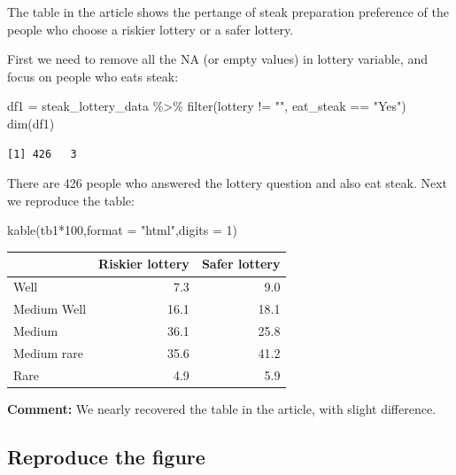 \documentclass[
  letterpaper,
  DIV=11,
  numbers=noendperiod]{scrartcl}
\newenvironment{Shaded}{\begin{snugshade}}{\end{snugshade}}
\newcommand{\AttributeTok}[1]{\textcolor[rgb]{0.40,0.45,0.13}{#1}}
\newcommand{\DecValTok}[1]{\textcolor[rgb]{0.68,0.00,0.00}{#1}}
\newcommand{\FunctionTok}[1]{\textcolor[rgb]{0.28,0.35,0.67}{#1}}
\newcommand{\NormalTok}[1]{\textcolor[rgb]{0.00,0.23,0.31}{#1}}
\newcommand{\OtherTok}[1]{\textcolor[rgb]{0.00,0.23,0.31}{#1}}
\newcommand{\SpecialCharTok}[1]{\textcolor[rgb]{0.37,0.37,0.37}{#1}}
\newcommand{\StringTok}[1]{\textcolor[rgb]{0.13,0.47,0.30}{#1}}
\begin{document}
The table in the article shows the pertange of steak preparation
preference of the people who choose a riskier lottery or a safer
lottery.

First we need to remove all the NA (or empty values) in lottery
variable, and focus on people who eats steak:

\begin{Shaded}
\begin{Highlighting}[]
\NormalTok{df1 }\OtherTok{=}\NormalTok{ steak\_lottery\_data }\SpecialCharTok{\%\textgreater{}\%}
  \FunctionTok{filter}\NormalTok{(lottery }\SpecialCharTok{!=} \StringTok{""}\NormalTok{, eat\_steak }\SpecialCharTok{==} \StringTok{"Yes"}\NormalTok{)}
\FunctionTok{dim}\NormalTok{(df1)}
\end{Highlighting}
\end{Shaded}

\begin{verbatim}
[1] 426   3
\end{verbatim}

There are 426 people who answered the lottery question and also eat
steak. Next we reproduce the table:

\begin{Shaded}
\begin{Highlighting}[]
\FunctionTok{kable}\NormalTok{(tb1}\SpecialCharTok{*}\DecValTok{100}\NormalTok{,}\AttributeTok{format =} \StringTok{"html"}\NormalTok{,}\AttributeTok{digits =} \DecValTok{1}\NormalTok{)}
\end{Highlighting}
\end{Shaded}

\begin{longtable}[]{@{}lrr@{}}
\toprule\noalign{}
& Riskier lottery & Safer lottery \\
\midrule\noalign{}
\endhead
\bottomrule\noalign{}
\endlastfoot
Well & 7.3 & 9.0 \\
Medium Well & 16.1 & 18.1 \\
Medium & 36.1 & 25.8 \\
Medium rare & 35.6 & 41.2 \\
Rare & 4.9 & 5.9 \\
\end{longtable}

\textbf{Comment:} We nearly recovered the table in the article, with
slight difference.

\subsection{Reproduce the figure}\label{reproduce-the-figure}
\end{document}
